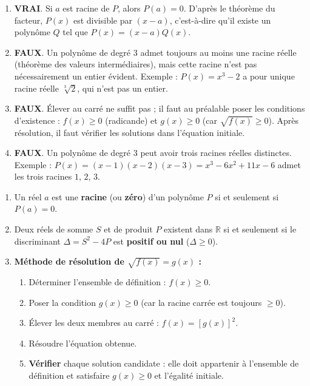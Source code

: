 \documentclass[11pt]{article}
\newcommand{\cle}[1]{{\popxbold\color{popdark}#1}}
\begin{document}
\begin{corrige}
\begin{enumerate}
\item \textbf{VRAI}. Si $a$ est racine de $P$, alors $P(a)=0$. D'après le \cle{théorème du facteur}, $P(x)$ est divisible par $(x-a)$, c'est-à-dire qu'il existe un polynôme $Q$ tel que $P(x)=(x-a)Q(x)$.
\item \textbf{FAUX}. Un polynôme de degré 3 admet toujours au moins une racine réelle (théorème des valeurs intermédiaires), mais cette racine n'est pas nécessairement un entier évident. Exemple : $P(x)=x^3-2$ a pour unique racine réelle $\sqrt[3]{2}$, qui n'est pas un entier.
\item \textbf{FAUX}. Élever au carré ne suffit pas ; il faut au préalable poser les \cle{conditions d'existence} : $f(x)\ge 0$ (radicande) et $g(x)\ge 0$ (car $\sqrt{f(x)}\ge 0$). Après résolution, il faut \cle{vérifier} les solutions dans l'équation initiale.
\item \textbf{FAUX}. Un polynôme de degré 3 peut avoir trois racines réelles distinctes. Exemple : $P(x)=(x-1)(x-2)(x-3)=x^3-6x^2+11x-6$ admet les trois racines $1$, $2$, $3$.
\end{enumerate}
\end{corrige}

\begin{corrige}
\begin{enumerate}
\item Un réel $a$ est une \textbf{racine} (ou \textbf{zéro}) d'un polynôme $P$ si et seulement si $P(a)=0$.
\item Deux réels de somme $S$ et de produit $P$ existent dans $\mathbb{R}$ si et seulement si le \cle{discriminant} $\Delta = S^2 - 4P$ est \textbf{positif ou nul} ($\Delta \ge 0$).
\item \textbf{Méthode de résolution de $\sqrt{f(x)} = g(x)$ :}
\begin{enumerate}
\item Déterminer l'ensemble de définition : $f(x) \ge 0$.
\item Poser la condition $g(x) \ge 0$ (car la racine carrée est toujours $\ge 0$).
\item Élever les deux membres au carré : $f(x) = [g(x)]^2$.
\item Résoudre l'équation obtenue.
\item \textbf{Vérifier} chaque solution candidate : elle doit appartenir à l'ensemble de définition et satisfaire $g(x) \ge 0$ et l'égalité initiale.
\end{enumerate}
\end{enumerate}
\end{corrige}
\end{document}
